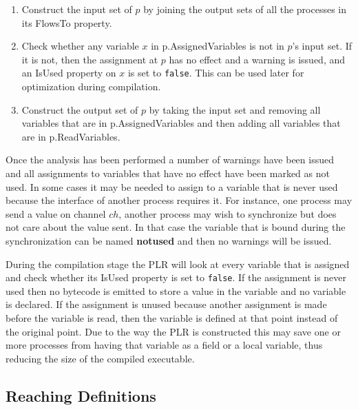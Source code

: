   	\begin{enumerate}
  		\item Construct the input set of $p$ by joining the output sets of all 
  		the processes in its \textsf{FlowsTo} property.

  		\item Check whether any variable $x$ in \textsf{p.AssignedVariables} is 
  		not in $p$'s input set. If it is not, then the assignment at $p$ has no 
  		effect and a warning is issued, and an \textsf{IsUsed} property on $x$ 
  		is set to \texttt{false}. This can be used later for optimization during 
  		compilation.
  		
  		\item Construct the output set of $p$ by taking the input set and 
  		removing all variables that are in \textsf{p.AssignedVariables} and then 
  		adding all variables that are in \textsf{p.ReadVariables}.
  	
  	\end{enumerate}
  
  Once the analysis has been performed a number of warnings have been issued 
  and all assignments to variables that have no effect have been marked as not 
  used. In some cases it may be needed to assign to a variable that is never 
  used because the interface of another process requires it. For instance, one 
  process may send a value on channel $ch$, another process may wish to 
  synchronize but does not care about the value sent. In that case the 
  variable that is bound during the synchronization can be named 
  \textbf{notused} and then no warnings will be issued.
  
  During the compilation stage the PLR will look at every variable that is 
  assigned and check whether its \textsf{IsUsed} property is set to 
  \texttt{false}. If the assignment is never used then no bytecode is emitted
  to store a value in the variable and no variable is declared. If the 
  assignment is unused because another assignment is made before the variable 
  is read, then the variable is defined at that point instead of the original 
  point. Due to the way the PLR is constructed this may save one or more
  processes from having that variable as a field or a local variable, thus
  reducing the size of the compiled executable.

\subsection{Reaching Definitions}\label{reaching_definitions}

